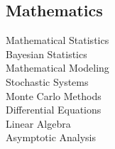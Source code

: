 \documentclass[letterpaper]{resume_AMcEnaney} %
\begin{document}
\begin{minipage}[t]{0.33\textwidth}
        \sectionspace %

    \subsection{Mathematics}

        \textbullet{} Mathematical Statistics \\
        \textbullet{} Bayesian Statistics \\
        \textbullet{} Mathematical Modeling \\
        \textbullet{} Stochastic Systems \\
        \textbullet{} Monte Carlo Methods \\
        \textbullet{} Differential Equations \\
        \textbullet{} Linear Algebra \\
        \textbullet{} Asymptotic Analysis \\



\end{minipage} %
\hfill
%
%
\end{document}
